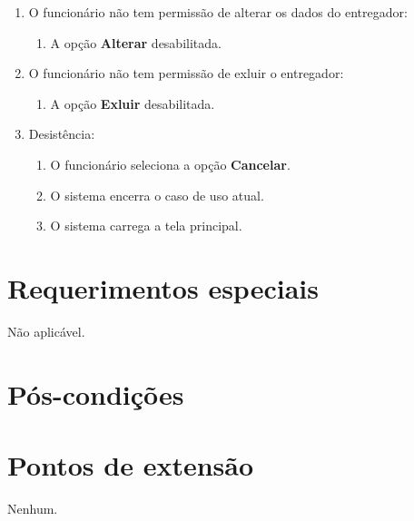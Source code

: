 \begin{enumerate}
	\item O funcionário não tem permissão de alterar os dados do entregador:
	\begin{enumerate}
		\item A opção \textbf{Alterar} desabilitada.
	\end{enumerate}
	\item O funcionário não tem permissão de exluir o entregador:
	\begin{enumerate}
		\item A opção \textbf{Exluir} desabilitada.
	\end{enumerate}	
	\item Desistência:
	\begin{enumerate}
		\item O funcionário seleciona a opção \textbf{Cancelar}.
		\item O sistema encerra o caso de uso atual.
		\item O sistema carrega a tela principal.
	\end{enumerate}
\end{enumerate}

\section{Requerimentos especiais}

Não aplicável.

\section{Pós-condições}

\section{Pontos de extensão}

Nenhum.